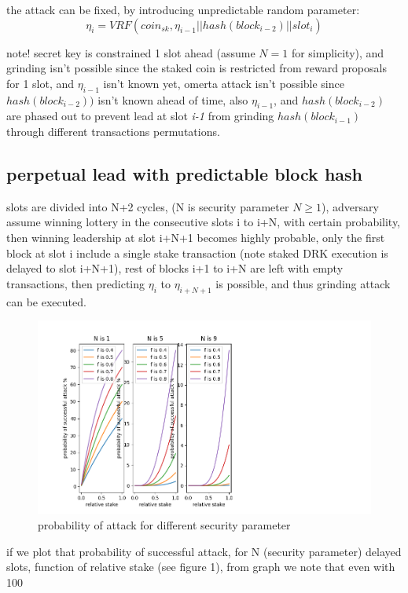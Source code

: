 \documentclass{article}
\begin{document}
the attack can be fixed, by introducing unpredictable random parameter: $$\eta_i = VRF(coin_{sk}, \eta_{i-1}||hash(block_{i-2})||slot_i)$$


note! secret key is constrained 1 slot ahead (assume $N=1$ for simplicity), and grinding isn't possible since the staked coin is restricted from reward proposals for 1 slot, and $\eta_{i-1}$ isn't known yet, omerta attack isn't possible since $hash(block_{i-2}))$ isn't known ahead of time, also $\eta_{i-1}$, and $hash(block_{i-2})$ are phased out to prevent lead at slot \emph{i-1} from grinding $hash(block_{i-1})$  through different transactions permutations.

\subsection {perpetual lead with predictable block hash}


slots are divided into N+2 cycles, (N is security parameter $N \ge 1$), adversary assume winning lottery in the consecutive slots i to i+N, with certain probability, then winning leadership at slot i+N+1 becomes highly probable, only the first block at slot i include a single stake transaction (note staked DRK execution is delayed to slot i+N+1), rest of blocks i+1 to i+N are left with empty transactions, then predicting $\eta_i$ to $\eta_{i+N+1}$ is possible, and thus grinding attack can be executed.

\begin{figure}
  \includegraphics[scale=0.8,left]{prob.png}
  \caption{probability of attack for different security parameter }
\end{figure}


if we plot that probability of successful attack, for N (security parameter) delayed slots, function of relative stake (see figure 1), from graph we  note that even with 100%
\end{document}
